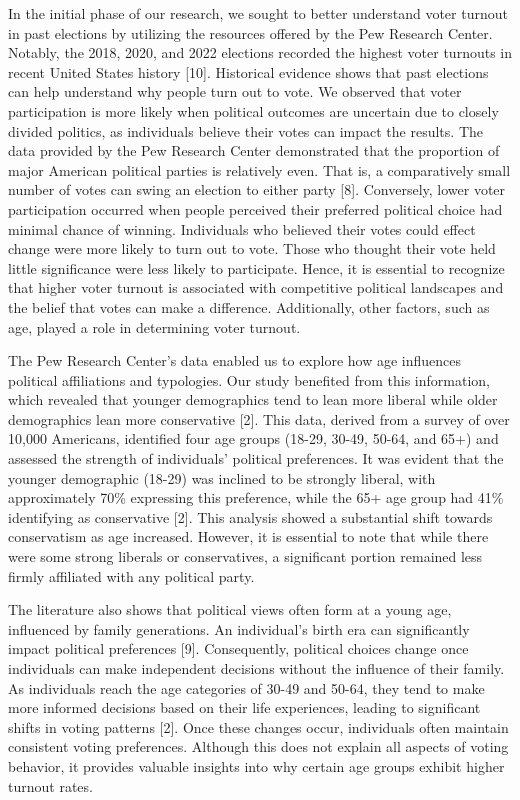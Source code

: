 \documentclass[titlepage, 12pt, leqno]{article} %
\begin{document}
In the initial phase of our research, we sought to better understand
voter turnout in past elections by utilizing the resources offered by 
the Pew Research Center. Notably, the 2018, 2020, and 2022 elections
recorded the highest voter turnouts in recent United States history 
[10]. Historical evidence shows that past elections can help understand why
people turn out to vote. We observed that voter participation is more likely 
when political outcomes are uncertain due to closely divided politics, as
individuals believe their votes can impact the results. The data provided by 
the Pew Research Center demonstrated that the proportion of major American
political parties is relatively even. That is, a comparatively small number of
votes can swing an election to either party [8]. Conversely, lower voter
participation occurred when people perceived their preferred political choice 
had minimal chance of winning. Individuals who believed their votes could 
effect change were more likely to turn out to vote. Those who thought their vote
held little significance were less likely to participate. Hence, it is essential
to recognize that higher voter turnout is associated with competitive political
landscapes and the belief that votes can make a difference. Additionally, other
factors, such as age, played a role in determining voter turnout.

The Pew Research Center's data enabled us to explore how age influences
political affiliations and typologies. Our study benefited from this 
information, which revealed that younger demographics tend to lean more liberal
while older demographics lean more conservative [2]. This data, derived from a
survey of over 10,000 Americans, identified four age groups (18-29, 30-49, 
50-64, and 65+) and assessed the strength of individuals' political preferences.
It was evident that the younger demographic (18-29) was inclined to be strongly
liberal, with approximately 70\% expressing this preference, while the 65+ age
group had 41\% identifying as conservative [2]. This analysis showed a
substantial shift towards conservatism as age increased. However, it is 
essential to note that while there were some strong liberals or conservatives, a
significant portion remained less firmly affiliated with any political party.

The literature also shows that political views often form at a young age,
influenced by family generations. An individual's birth era can significantly
impact political preferences [9]. Consequently, political choices change once
individuals can make independent decisions without the influence of their 
family. As individuals reach the age categories of 30-49 and 50-64, they tend to
make more informed decisions based on their life experiences, leading to
significant shifts in voting patterns [2]. Once these changes occur, individuals
often maintain consistent voting preferences. Although this does not explain all
aspects of voting behavior, it provides valuable insights into why certain age
groups exhibit higher turnout rates.
\end{document}
